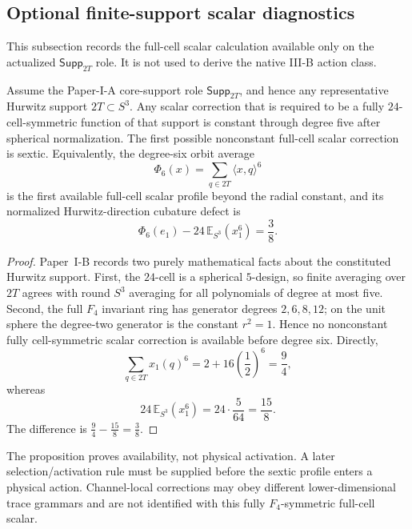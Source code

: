 \documentclass[11pt,a4paper]{article}
\begin{document}
\subsection{Optional finite-support scalar diagnostics}
\label{p3b:app:finite-support-scalar}
This subsection records the full-cell scalar calculation available only on the
actualized \(\mathsf{Supp}_{2T}\) role.  It is not used to derive the native
III-B action class.

\begin{proposition}
\label{p3:prop:first-symmetric-finite-cell-correction}
Assume the Paper-I-A core-support role
\(\mathsf{Supp}_{2T}\), and hence any representative Hurwitz support
\(2T\subset S^3\).
Any scalar correction that is required to be a fully
\(24\)-cell-symmetric function of that support is constant through degree
five after spherical normalization.  The first possible nonconstant
full-cell scalar correction is sextic.  Equivalently, the degree-six orbit average
\[
\Phi_6(x)=\sum_{q\in 2T}\langle x,q\rangle^6
\]
is the first available full-cell scalar profile beyond the radial constant, and its normalized Hurwitz-direction cubature defect is
\[
\Phi_6(e_1)-24\,\mathbb E_{S^3}(x_1^6)=\frac38.
\]
\end{proposition}

\begin{proof}
Paper~I-B records two purely mathematical facts about the constituted Hurwitz support.  First, the \(24\)-cell is a spherical \(5\)-design, so finite averaging over \(2T\) agrees with round \(S^3\) averaging for all polynomials of degree at most five.  Second, the full \(F_4\) invariant ring has generator degrees \(2,6,8,12\); on the unit sphere the degree-two generator is the constant \(r^2=1\).  Hence no nonconstant fully cell-symmetric scalar correction is available before degree six.  Directly,
\[
\sum_{q\in2T}x_1(q)^6=2+16\left(\frac12\right)^6=\frac94,
\]
whereas
\[
24\,\mathbb E_{S^3}(x_1^6)
=24\cdot\frac5{64}
=\frac{15}{8}.
\]
The difference is \(\frac94-\frac{15}{8}=\frac38\).
\end{proof}

\begin{remark}
The proposition proves availability, not physical activation.  A later
selection/activation rule must be supplied before the sextic profile enters a
physical action.  Channel-local corrections may obey different
lower-dimensional trace grammars and are not identified with this fully
\(F_4\)-symmetric full-cell scalar.
\end{remark}
\end{document}
